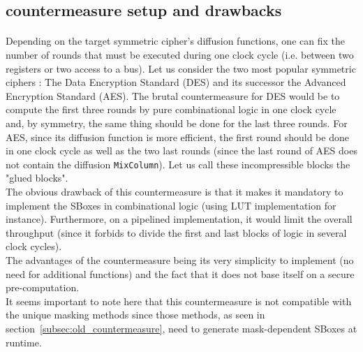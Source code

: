 \documentclass[11pt,a4paper]{article}
\begin{document}
{{{{{{\subsection{countermeasure setup and drawbacks}
\paragraph{}
Depending on the target symmetric cipher's diffusion functions, one can fix the number of rounds that must be executed during one clock cycle (i.e. between 
two registers or two access to a bus). Let us consider the two most popular symmetric ciphers : The Data Encryption Standard (DES) and its successor the Advanced Encryption Standard (AES).
The brutal countermeasure for DES would be to compute the first three rounds by pure combinational logic in one clock cycle and, by symmetry, the same thing should be done for the 
last three rounds. For AES, since its diffusion function is more efficient, the first round should be done in one clock cycle as well as the two last rounds (since the last round of AES does not 
contain the diffusion \texttt{MixColumn}). Let us call these incompressible blocks the "glued blocks".\\
The obvious drawback of this countermeasure is that it makes it mandatory to implement the SBoxes in combinational logic (using LUT implementation for instance). Furthermore, on a
pipelined implementation, it would limit the overall throughput (since it forbids to divide the first and last blocks of logic in several clock cycles). \\
The advantages of the countermeasure being its very simplicity to implement (no need for additional functions) and the fact that it does not base itself on a secure pre-computation.\\
It seems important to note here that this countermeasure is not compatible with the unique masking methods since those methods, as seen in section~\ref{subsec:old_countermeasure}, need to 
generate mask-dependent SBoxes at runtime.
\vspace{1ex} \\
}}}}}}
\end{document}
